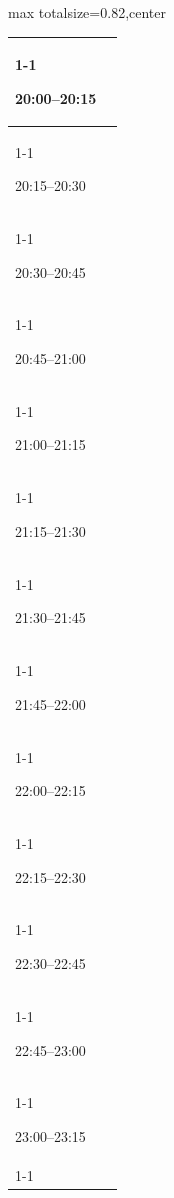 \documentclass[11pt,a4paper]{article}
\begin{document}
\begin{center}
\begin{adjustbox}{max totalsize={\textwidth}{0.82\textheight},center}
\begin{tabular}{|p{3.6cm}|p{11cm}|}
\cline{1-1}
{\centering\rule{0pt}{2.80ex}20:00--20:15} & {\centering\rule{0pt}{2.80ex}} \\
\cline{1-1}
{\centering\rule{0pt}{2.80ex}20:15--20:30} & {\centering\rule{0pt}{2.80ex}} \\
\cline{1-1}
{\centering\rule{0pt}{2.80ex}20:30--20:45} & {\centering\rule{0pt}{2.80ex}} \\
\cline{1-1}
{\centering\rule{0pt}{2.80ex}20:45--21:00} & {\centering\rule{0pt}{2.80ex}} \\
\cline{1-1}
{\centering\rule{0pt}{2.80ex}21:00--21:15} & {\centering\rule{0pt}{2.80ex}} \\
\cline{1-1}
{\centering\rule{0pt}{2.80ex}21:15--21:30} & {\centering\rule{0pt}{2.80ex}} \\
\cline{1-1}
{\centering\rule{0pt}{2.80ex}21:30--21:45} & {\centering\rule{0pt}{2.80ex}} \\
\cline{1-1}
{\centering\rule{0pt}{2.80ex}21:45--22:00} & {\centering\rule{0pt}{2.80ex}} \\
\cline{1-1}
{\centering\rule{0pt}{2.80ex}22:00--22:15} & {\centering\rule{0pt}{2.80ex}} \\
\cline{1-1}
{\centering\rule{0pt}{2.80ex}22:15--22:30} & {\centering\rule{0pt}{2.80ex}} \\
\cline{1-1}
{\centering\rule{0pt}{2.80ex}22:30--22:45} & {\centering\rule{0pt}{2.80ex}} \\
\cline{1-1}
{\centering\rule{0pt}{2.80ex}22:45--23:00} & {\centering\rule{0pt}{2.80ex}} \\
\cline{1-1}
{\centering\rule{0pt}{2.80ex}23:00--23:15} & {\centering\rule{0pt}{2.80ex}} \\
\cline{1-1}
\hline
\end{tabular}
\end{adjustbox}
\end{center}

\clearpage
\end{document}
